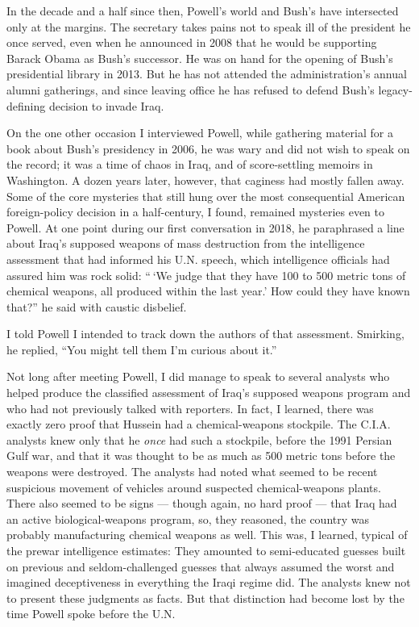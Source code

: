 In the decade and a half since then, Powell's world and Bush's have
intersected only at the margins. The secretary takes pains not to speak
ill of the president he once served, even when he announced in 2008 that
he would be supporting Barack Obama as Bush's successor. He was on hand
for the opening of Bush's presidential library in 2013. But he has not
attended the administration's annual alumni gatherings, and since
leaving office he has refused to defend Bush's legacy-defining decision
to invade Iraq.

On the one other occasion I interviewed Powell, while gathering material
for a book about Bush's presidency in 2006, he was wary and did not wish
to speak on the record; it was a time of chaos in Iraq, and of
score-settling memoirs in Washington. A dozen years later, however, that
caginess had mostly fallen away. Some of the core mysteries that still
hung over the most consequential American foreign-policy decision in a
half-century, I found, remained mysteries even to Powell. At one point
during our first conversation in 2018, he paraphrased a line about
Iraq's supposed weapons of mass destruction from the intelligence
assessment that had informed his U.N. speech, which intelligence
officials had assured him was rock solid: `` `We judge that they have
100 to 500 metric tons of chemical weapons, all produced within the last
year.' How could they have known that?'' he said with caustic disbelief.

I told Powell I intended to track down the authors of that assessment.
Smirking, he replied, ``You might tell them I'm curious about it.''

Not long after meeting Powell, I did manage to speak to several analysts
who helped produce the classified assessment of Iraq's supposed weapons
program and who had not previously talked with reporters. In fact, I
learned, there was exactly zero proof that Hussein had a
chemical-weapons stockpile. The C.I.A. analysts knew only that he
\emph{once} had such a stockpile, before the 1991 Persian Gulf war, and
that it was thought to be as much as 500 metric tons before the weapons
were destroyed. The analysts had noted what seemed to be recent
suspicious movement of vehicles around suspected chemical-weapons
plants. There also seemed to be signs --- though again, no hard proof
--- that Iraq had an active biological-weapons program, so, they
reasoned, the country was probably manufacturing chemical weapons as
well. This was, I learned, typical of the prewar intelligence estimates:
They amounted to semi-educated guesses built on previous and
seldom-challenged guesses that always assumed the worst and imagined
deceptiveness in everything the Iraqi regime did. The analysts knew not
to present these judgments as facts. But that distinction had become
lost by the time Powell spoke before the U.N.

